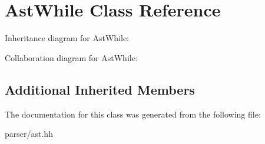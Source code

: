 \hypertarget{classAstWhile}{}\section{Ast\+While Class Reference}
\label{classAstWhile}


Inheritance diagram for Ast\+While\+:


Collaboration diagram for Ast\+While\+:
\subsection*{Additional Inherited Members}


The documentation for this class was generated from the following file\+:\begin{DoxyCompactItemize}
\item 
parser/ast.\+hh\end{DoxyCompactItemize}
